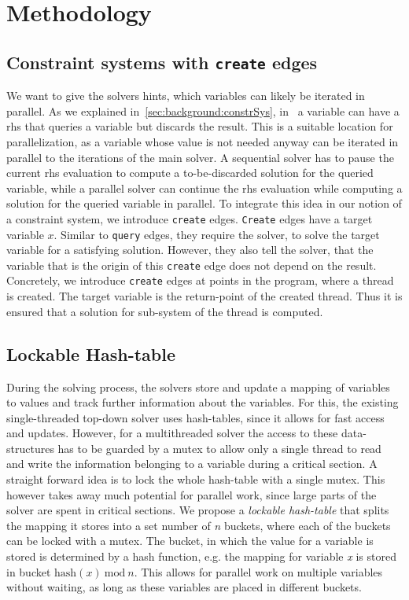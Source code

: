 \section{Methodology}
\label{sec:method}


  \subsection{Constraint systems with \texttt{create} edges}
  \label{sec:method:create}
  We want to give the solvers hints, which variables can likely be iterated in parallel. As we explained in~\autoref{sec:background:constrSys}, in \gob\ a variable can have a \ac{rhs} that queries a variable but discards the result. This is a suitable location for parallelization, as a variable whose value is not needed anyway can be iterated in parallel to the iterations of the main solver. A sequential solver has to pause the current \ac{rhs} evaluation to compute a to-be-discarded solution for the queried variable, while a parallel solver can continue the \ac{rhs} evaluation while computing a solution for the queried variable in parallel.
  To integrate this idea in our notion of a constraint system, we introduce \texttt{create} edges. \texttt{Create} edges have a target variable $x$. Similar to \texttt{query} edges, they require the solver, to solve the target variable for a satisfying solution. However, they also tell the solver, that the variable that is the origin of this \texttt{create} edge does not depend on the result. Concretely, we introduce \texttt{create} edges at points in the program, where a thread is created. The target variable is the return-point of the created thread. Thus it is ensured that a solution for sub-system of the thread is computed.

  \subsection{Lockable Hash-table}
  \label{sec:method:LHM}
  During the solving process, the solvers store and update a mapping of variables to values and track further information about the variables. For this, the existing single-threaded top-down solver uses hash-tables, since it allows for fast access and updates. However, for a multithreaded solver the access to these data-structures has to be guarded by a mutex to allow only a single thread to read and write the information belonging to a variable during a critical section. 
  A straight forward idea is to lock the whole hash-table with a single mutex. This however takes away much potential for parallel work, since large parts of the solver are spent in critical sections.
  We propose a \textit{lockable hash-table} that splits the mapping it stores into a set number of \textit{n} buckets, where each of the buckets can be locked with a mutex. The bucket, in which the value for a variable is stored is determined by a hash function, e.g. the mapping for variable \textit{x} is stored in bucket $\text{hash}(x)\ \text{mod}\ n$. This allows for parallel work on multiple variables without waiting, as long as these variables are placed in different buckets.

